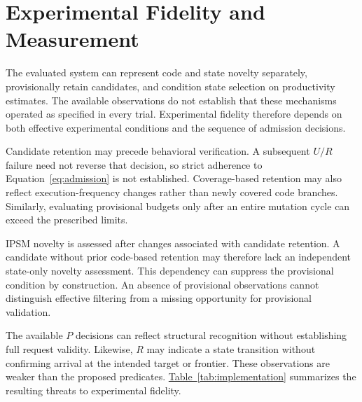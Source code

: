 \documentclass[final,5p,times,number]{elsarticle}
\newcommand{\namedref}[2]{\hyperref[#2]{#1~\ref*{#2}}}
\begin{document}
\section{Experimental Fidelity and Measurement}
\label{sec:implementation}
The evaluated system can represent code and state novelty separately, provisionally retain candidates, and condition state selection on productivity estimates. The available observations do not establish that these mechanisms operated as specified in every trial. Experimental fidelity therefore depends on both effective experimental conditions and the sequence of admission decisions.

Candidate retention may precede behavioral verification. A subsequent $U/R$ failure need not reverse that decision, so strict adherence to Equation~\ref{eq:admission} is not established. Coverage-based retention may also reflect execution-frequency changes rather than newly covered code branches. Similarly, evaluating provisional budgets only after an entire mutation cycle can exceed the prescribed limits.

IPSM novelty is assessed after changes associated with candidate retention. A candidate without prior code-based retention may therefore lack an independent state-only novelty assessment. This dependency can suppress the provisional condition by construction. An absence of provisional observations cannot distinguish effective filtering from a missing opportunity for provisional validation.

The available $P$ decisions can reflect structural recognition without establishing full request validity. Likewise, $R$ may indicate a state transition without confirming arrival at the intended target or frontier. These observations are weaker than the proposed predicates. \namedref{Table}{tab:implementation} summarizes the resulting threats to experimental fidelity.
\end{document}
